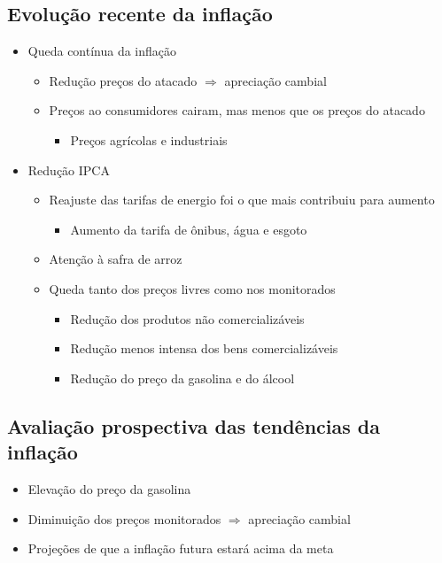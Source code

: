 \documentclass[11pt]{article}
\begin{document}
\subsection*{Evolução recente da inflação}
\label{sec:org1aa798b}
\begin{itemize}
\item Queda contínua da inflação
\begin{itemize}
\item Redução preços do atacado \(\Rightarrow\) apreciação cambial
\item Preços ao consumidores cairam, mas menos que os preços do atacado
\begin{itemize}
\item Preços agrícolas e industriais
\end{itemize}
\end{itemize}
\item Redução IPCA
\begin{itemize}
\item Reajuste das tarifas de energio foi o que mais contribuiu para aumento
\begin{itemize}
\item Aumento da tarifa de ônibus, água e esgoto
\end{itemize}
\item Atenção à safra de arroz
\item Queda tanto dos preços livres como nos monitorados
\begin{itemize}
\item Redução dos produtos não comercializáveis
\item Redução menos intensa dos bens comercializáveis
\item Redução do preço da gasolina e do álcool
\end{itemize}
\end{itemize}
\end{itemize}
\subsection*{Avaliação prospectiva das tendências da inflação}
\label{sec:org27d40b9}
\begin{itemize}
\item Elevação do preço da gasolina
\item Diminuição dos preços monitorados \(\Rightarrow\) apreciação cambial
\item Projeções de que a inflação futura estará acima da meta
\end{itemize}
\end{document}
